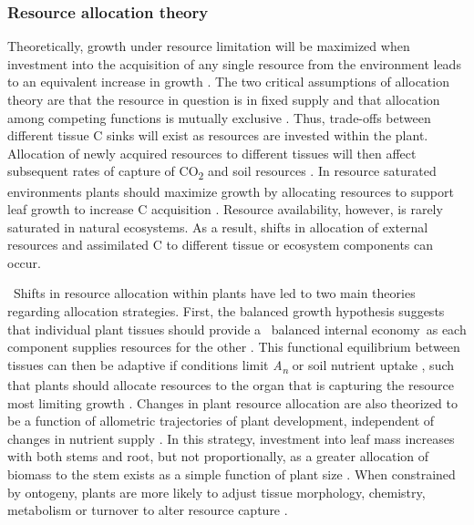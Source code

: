 \documentclass[a4paper]{article}
\begin{document}
\subsubsection*{Resource allocation theory}
Theoretically, growth under resource limitation will be maximized when investment into the acquisition of any single resource from the environment leads to an equivalent increase in growth \citep{bloom1985resource}. The two critical assumptions of allocation theory are that the resource in question is in fixed supply and that allocation among competing functions is mutually exclusive \citep{bazzaz2000reproductive}. Thus, trade-offs between different tissue C sinks will exist as resources are invested within the plant. Allocation of newly acquired resources to different tissues will then affect subsequent rates of capture of CO\textsubscript{2} and soil resources \citep{shipley2002balanced}. In resource saturated environments plants should maximize growth by allocating resources to support leaf growth to increase C acquisition \citep{monsi2005factor}. Resource availability, however, is rarely saturated in natural ecosystems. As a result, shifts in allocation of external resources and assimilated C to different tissue or ecosystem components can occur.

\
Shifts in resource allocation within plants have led to two main theories regarding allocation strategies. First, the balanced growth hypothesis suggests that individual plant tissues should provide a \textquotesingle~balanced internal economy\textquotesingle~as each component supplies resources for the other \citep{davidson1969effect}. This functional equilibrium between tissues can then be adaptive if conditions limit \textit{A\textsubscript{n}} or soil nutrient uptake \citep{cannell1985attributes}, such that plants should allocate resources to the organ that is capturing the resource most limiting growth \citep{shipley2002balanced}. Changes in plant resource allocation are also theorized to be a function of allometric trajectories of plant development, independent of changes in nutrient supply \citep{muller2000effect}. In this strategy, investment into leaf mass increases with both stems and root, but not proportionally, as a greater allocation of biomass to the stem exists as a simple function of plant size \citep{zens2002sizing}. When constrained by ontogeny, plants are more likely to adjust tissue morphology, chemistry, metabolism or turnover to alter resource capture \citep{reich2002root}. 
\end{document}
